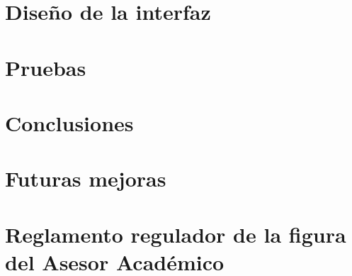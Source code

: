 \documentclass[a4paper,12pt]{book}
\begin{document}
   \chapter{Diseño de la interfaz}
      
      
      

   \chapter{Pruebas}\label{pruebas}
      
      
      
      

   \chapter{Conclusiones}
      

   \chapter{Futuras mejoras}\label{futurasMejoras}
    

   \listoffigures

   

   \appendix
   \chapter{Reglamento regulador de la figura del Asesor Académico}\label{a1}
   
\end{document}
